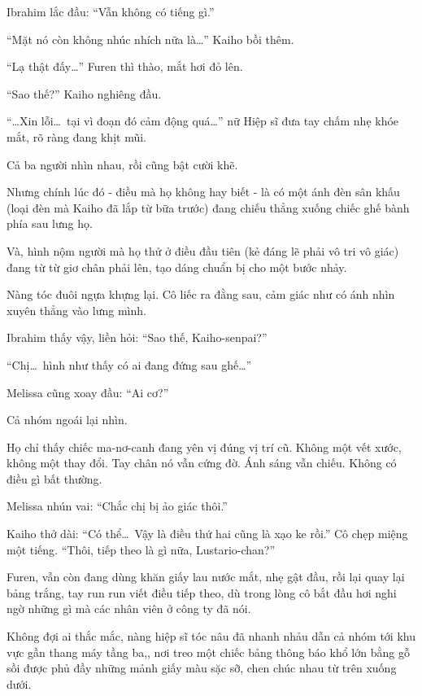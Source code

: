 \documentclass[../main.tex]{subfiles}
\begin{document}
Ibrahim lắc đầu: ``Vẫn không có tiếng gì.''

``Mặt nó còn không nhúc nhích nữa là\dots'' Kaiho bồi thêm.

``Lạ thật đấy\dots'' Furen thì thào, mắt hơi đỏ lên.

``Sao thế?'' Kaiho nghiêng đầu.

``\dots Xin lỗi\dots\ tại vì đoạn đó cảm động quá\dots'' nữ Hiệp sĩ đưa tay chấm nhẹ khóe mắt, rõ ràng đang khịt mũi.

Cả ba người nhìn nhau, rồi cũng bật cười khẽ.

Nhưng chính lúc đó - điều mà họ không hay biết - là có một ánh đèn sân khấu (loại đèn mà Kaiho đã lắp từ bữa trước) đang chiếu thẳng xuống chiếc ghế bành phía sau lưng họ.

Và, hình nộm người mà họ thử ở điều đầu tiên (kẻ đáng lẽ phải vô tri vô giác) đang từ từ giơ chân phải lên, tạo dáng chuẩn bị cho một bước nhảy.


Nàng tóc đuôi ngựa khựng lại. Cô liếc ra đằng sau, cảm giác như có ánh nhìn xuyên thẳng vào lưng mình.

Ibrahim thấy vậy, liền hỏi: ``Sao thế, Kaiho-senpai?''

``Chị\dots\ hình như thấy có ai đang đứng sau ghế\dots''

Melissa cũng xoay đầu: ``Ai cơ?''

Cả nhóm ngoái lại nhìn.

Họ chỉ thấy chiếc ma-nơ-canh đang yên vị đúng vị trí cũ. Không một vết xước, không một thay đổi. Tay chân nó vẫn cứng đờ. Ánh sáng vẫn chiếu. Không có điều gì bất thường.

Melissa nhún vai: ``Chắc chị bị ảo giác thôi.''

Kaiho thở dài: ``Có thể\dots\ Vậy là điều thứ hai cũng là xạo ke rồi.'' Cô chẹp miệng một tiếng. ``Thôi, tiếp theo là gì nữa, Lustario-chan?''

Furen, vẫn còn đang dùng khăn giấy lau nước mắt, nhẹ gật đầu, rồi lại quay lại bảng trắng, tay run run viết điều tiếp theo, dù trong lòng cô bắt đầu hơi nghi ngờ những gì mà các nhân viên ở công ty đã nói.


Không đợi ai thắc mắc, nàng hiệp sĩ tóc nâu đã nhanh nhảu dẫn cả nhóm tới khu vực gần thang máy tầng ba,, nơi treo một chiếc bảng thông báo khổ lớn bằng gỗ sồi được phủ đầy những mảnh giấy màu sặc sỡ, chen chúc nhau từ trên xuống dưới.
\end{document}
